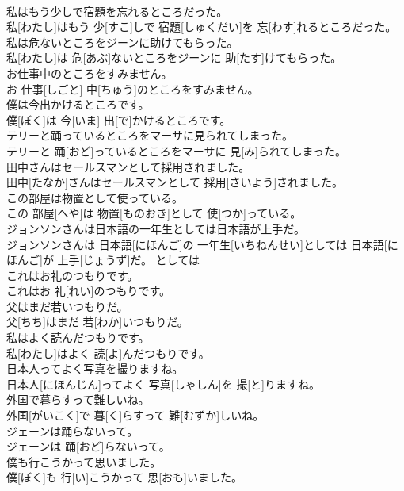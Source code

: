 \documentclass[8pt]{extreport}
\begin{document}
\begin{CJK}{UTF8}{min}
\\	私はもう少しで宿題を忘れるところだった。	
\\	私[わたし]はもう 少[すこ]しで 宿題[しゅくだい]を 忘[わす]れるところだった。	
\\	私は危ないところをジーンに助けてもらった。	
\\	私[わたし]は 危[あぶ]ないところをジーンに 助[たす]けてもらった。	
\\	お仕事中のところをすみません。	
\\	お 仕事[しごと] 中[ちゅう]のところをすみません。	
\\	僕は今出かけるところです。	
\\	僕[ぼく]は 今[いま] 出[で]かけるところです。	
\\	テリーと踊っているところをマーサに見られてしまった。	
\\	テリーと 踊[おど]っているところをマーサに 見[み]られてしまった。	
\\	田中さんはセールスマンとして採用されました。	
\\	田中[たなか]さんはセールスマンとして 採用[さいよう]されました。	
\\	この部屋は物置として使っている。	
\\	この 部屋[へや]は 物置[ものおき]として 使[つか]っている。	
\\	ジョンソンさんは日本語の一年生としては日本語が上手だ。	
\\	ジョンソンさんは 日本語[にほんご]の 一年生[いちねんせい]としては 日本語[にほんご]が 上手[じょうず]だ。	としては 
\\	これはお礼のつもりです。	
\\	これはお 礼[れい]のつもりです。	
\\	父はまだ若いつもりだ。	
\\	父[ちち]はまだ 若[わか]いつもりだ。	
\\	私はよく読んだつもりです。	
\\	私[わたし]はよく 読[よ]んだつもりです。	
\\	日本人ってよく写真を撮りますね。	
\\	日本人[にほんじん]ってよく 写真[しゃしん]を 撮[と]りますね。	
\\	外国で暮らすって難しいね。	
\\	外国[がいこく]で 暮[く]らすって 難[むずか]しいね。	
\\	ジェーンは踊らないって。	
\\	ジェーンは 踊[おど]らないって。	
\\	僕も行こうかって思いました。	
\\	僕[ぼく]も 行[い]こうかって 思[おも]いました。	

\end{CJK}
\end{document}
